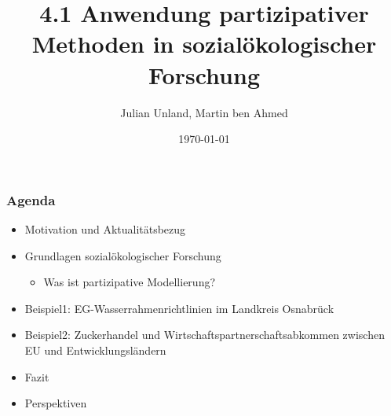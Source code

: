 \documentclass{beamer}
\title[4.1 Partizipative Methoden]{4.1 Anwendung partizipativer Methoden in sozialökologischer Forschung} %
\author{Julian Unland, Martin ben Ahmed} %
\institute[UOS] %
{
Universität Osnabrück \\ %
\medskip
\textit{juunland@uos.de} %
\textit{mbenahmed@uos.de} %
}
\date{\today} %
\begin{document}
\begin{frame}
\titlepage %
\end{frame}





\begin{frame}
\frametitle{Agenda}
\begin{itemize}
\item Motivation und Aktualitätsbezug
\item Grundlagen sozialökologischer Forschung
	\begin{itemize}
	\item Was ist partizipative Modellierung?
	\end{itemize}
\item Beispiel1: EG-Wasserrahmenrichtlinien im Landkreis Osnabrück
\item Beispiel2: Zuckerhandel und Wirtschaftspartnerschaftsabkommen zwischen EU und Entwicklungsländern
\item Fazit
\item Perspektiven
\end{itemize}
\end{frame}


\end{document}

